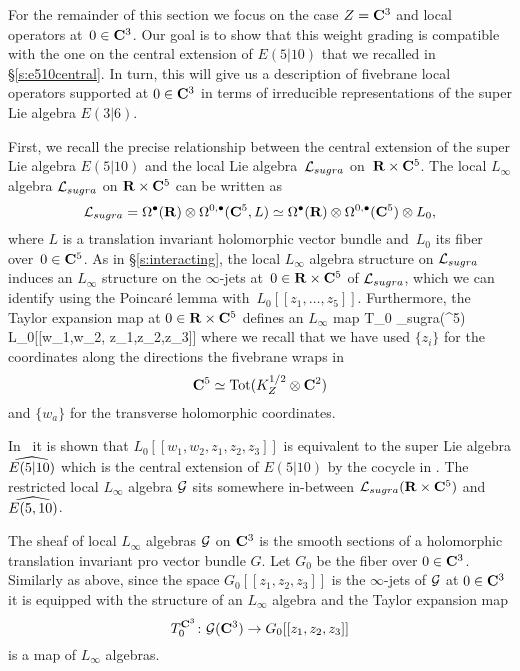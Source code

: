 \documentclass[11pt]{amsart}
\begin{document}
For the remainder of this section we focus on the case $Z = \C^3$ and local operators at~$0 \in \C^3$. 
Our goal is to show that this weight grading is compatible with the one on the central extension of $E(5|10)$ that we recalled in \S \ref{s:e510central}. 
In turn, this will give us a description of fivebrane local operators supported at $0 \in \C^3$ in terms of irreducible representations of the super Lie algebra $E(3|6)$. 

\parsec[]

First, we recall the precise relationship between the central extension of the super Lie algebra $E(5|10)$ and the local Lie algebra~$\cL_{sugra}$ on~$\R \times \C^5$.
The local $L_\infty$ algebra $\cL_{sugra}$ on $\R \times \C^5$ can be written as 
\[
\cL_{sugra} = \Omega^\bu(\R) \otimes \Omega^{0,\bu}(\C^5, L) \simeq \Omega^\bu(\R) \otimes \Omega^{0,\bu}(\C^5) \otimes L_0 ,
\]
where $L$ is a translation invariant holomorphic vector bundle and~$L_0$ its fiber over~$0 \in \C^5$.
As in \S \ref{s:interacting}, the local $L_\infty$ algebra structure on $\cL_{sugra}$ induces an $L_\infty$ structure on the $\infty$-jets at~$0 \in \R \times \C^5$ of $\cL_{sugra}$, which we can identify using the Poincar\'e lemma with~$L_0[[z_1,\ldots,z_5]]$.
Furthermore, the Taylor expansion map at $0 \in \R \times \C^5$ defines an $L_\infty$ map
\beqn
T_0 \colon \cL_{sugra}(\R \times \C^5) \to L_0[[w_1,w_2, z_1,z_2,z_3]] 
\eeqn
where we recall that we have used $\{z_i\}$ for the coordinates along the directions the fivebrane wraps in 
\[
\C^5 \simeq {\rm Tot}(K^{1/2}_Z \otimes \C^2)
\]
and $\{w_a\}$ for the transverse holomorphic coordinates. 

In~\cite{RSW} it is shown that $L_0[[w_1,w_2, z_1,z_2,z_3]]$ is equivalent to the super Lie algebra $\Hat{E(5|10)}$ which is the central extension of $E(5|10)$ by the cocycle in . 
The restricted local $L_\infty$ algebra $\cG$ sits somewhere in-between $\cL_{sugra}(\R \times \C^5)$ and $\Hat{E(5,10)}$. 

The sheaf of local $L_\infty$ algebras $\cG$ on $\C^3$ is the smooth sections of a holomorphic translation invariant pro vector bundle $G$. 
Let $G_0$ be the fiber over $0 \in \C^3$. 
Similarly as above, since the space $G_0[[z_1,z_2,z_3]]$ is the $\infty$-jets of $\cG$ at $0 \in \C^3$ it is equipped with the structure of an $L_\infty$ algebra and the Taylor expansion map 
\[
T_0^{\C^3} \colon \cG(\C^3) \to G_0[[z_1,z_2,z_3]] 
\]
is a map of $L_\infty$ algebras. 
\end{document}
